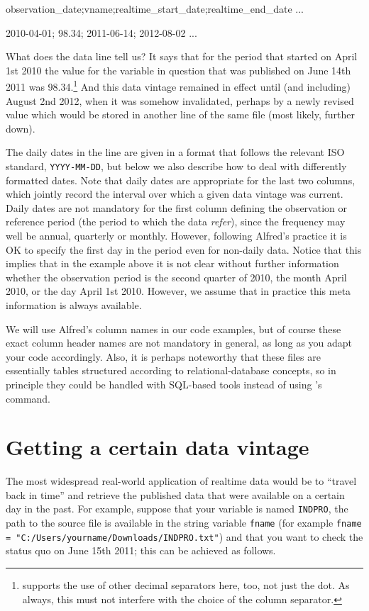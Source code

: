 \begin{code}
observation_date;vname;realtime_start_date;realtime_end_date
...

2010-04-01; 98.34; 2011-06-14; 2012-08-02
...
\end{code}

What does the data line tell us? It says that for the period that
started on April 1st 2010 the value for the variable in question that
was published on June 14th 2011 was 98.34.\footnote{
  supports the use of other decimal separators here, too, not just the
  dot. As always, this must not interfere with the choice of the
  column separator.} And this data vintage remained in effect until
(and including) August 2nd 2012, when it was somehow invalidated,
perhaps by a newly revised value which would be stored in another line
of the same file (most likely, further down).

The daily dates in the line are given in a format that follows the
relevant ISO standard, \texttt{YYYY-MM-DD}, but below we also describe
how to deal with differently formatted dates. Note that daily dates
are appropriate for the last two columns, which jointly record the
interval over which a given data vintage was current. Daily dates are
not mandatory for the first column defining the observation or
reference period (the period to which the data \textit{refer}), since
the frequency may well be annual, quarterly or monthly. However,
following Alfred's practice it is OK to specify the first day in the
period even for non-daily data. Notice that this implies that in the
example above it is not clear without further information whether the
observation period is the second quarter of 2010, the month April
2010, or the day April 1st 2010.  However, we assume that in practice
this meta information is always available.

We will use Alfred's column names in our code examples, but of course
these exact column header names are not mandatory in general, as long
as you adapt your code accordingly. Also, it is perhaps noteworthy
that these files are essentially tables structured according to
relational-database concepts, so in principle they could be handled
with SQL-based tools instead of using 's 
command.

\section{Getting a certain data vintage }

The most widespread real-world application of realtime data would be
to ``travel back in time'' and retrieve the published data that were
available on a certain day in the past. For example, suppose that your
variable is named \texttt{INDPRO}, the path to the source file is
available in the string variable \texttt{fname} (for example
\verb|fname = "C:/Users/yourname/Downloads/INDPRO.txt"|) and that you
want to check the status quo on June 15th 2011; this can be achieved
as follows.


